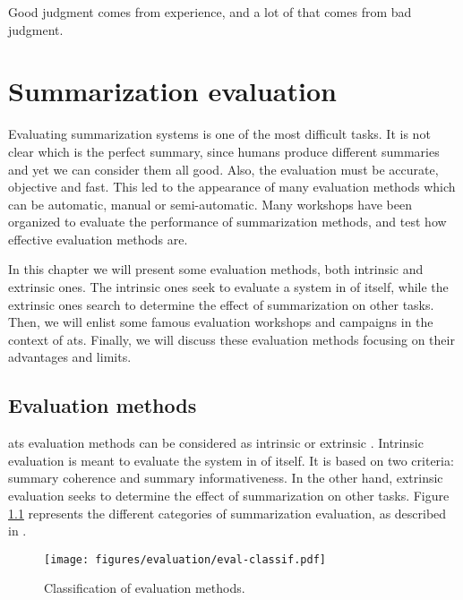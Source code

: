 \begin{savequote}[75mm] 
	Good judgment comes from experience, and a lot of that comes from bad judgment.
\end{savequote}

\chapter{Summarization evaluation}
\label{chap:eval}


Evaluating summarization systems is one of the most difficult tasks. 
It is not clear which is the perfect summary, since humans produce different summaries and yet we can consider them all good. 
Also, the evaluation must be accurate, objective and fast. 
This led to the appearance of many evaluation methods which can be automatic, manual or semi-automatic. 
Many workshops have been organized to evaluate the performance of summarization methods, and test how effective evaluation methods are.

In this chapter we will present some evaluation methods, both intrinsic and extrinsic ones. 
The intrinsic ones seek to evaluate a system in of itself, while the extrinsic ones search to determine the effect of summarization on other tasks.
Then, we will enlist some famous evaluation workshops and campaigns in the context of \ac{ats}. 
Finally, we will discuss these evaluation methods focusing on their advantages and limits.

\section{Evaluation methods}

\ac{ats} evaluation methods can be considered as intrinsic or extrinsic \citep{01-mani}.
Intrinsic evaluation is meant to evaluate the system in of itself. 
It is based on two criteria: summary coherence and summary informativeness. %
In the other hand, extrinsic evaluation seeks to determine the effect of summarization on other tasks. 
Figure \ref{fig:eval-classif} represents the different categories of summarization evaluation, as described in \citep{01-mani}.
%
\begin{figure}[!ht]
	\begin{center}
		\texttt{[image: figures/evaluation/eval-classif.pdf]} %
		\caption{Classification of evaluation methods.}
		\label{fig:eval-classif}
	\end{center}
\end{figure}

